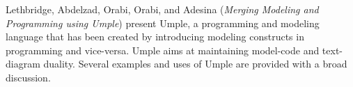 


Lethbridge, Abdelzad, Orabi, Orabi, and Adesina
\cite{isola-2016-lethbridge}
({\em Merging Modeling and Programming using Umple})
present Umple, a programming and modeling language that has been created by introducing modeling constructs in programming and vice-versa. Umple aims at maintaining model-code and text-diagram duality. Several examples and uses of Umple are provided with a broad discussion.


